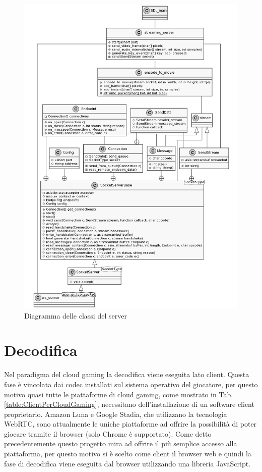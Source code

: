 \begin{figure}[H]
	\includegraphics[width=\linewidth]{immagini/class_server_and_encoding_full}
	\caption{Diagramma delle classi del server}
	\label{fig:class_server_and_encoding_full}
\end{figure}




\section{Decodifica}
Nel paradigma del cloud gaming la decodifica viene eseguita lato client. Questa fase è vincolata dai codec installati sul sistema operativo del giocatore, per questo motivo quasi tutte le piattaforme di cloud gaming, come mostrato in Tab. \ref{table:ClientPerCloudGaming}, necessitano dell'installazione di un software client proprietario. Amazon Luna e Google Stadia, che utilizzano la tecnologia WebRTC, sono attualmente le uniche piattaforme ad offrire la possibilità di poter giocare tramite il browser (solo Chrome è supportato). Come detto precedentemente questo progetto mira ad offrire il più semplice accesso alla piattaforma, per questo motivo si è scelto come client il browser web e quindi la fase di decodifica viene eseguita dal browser utilizzando una libreria JavaScript.

